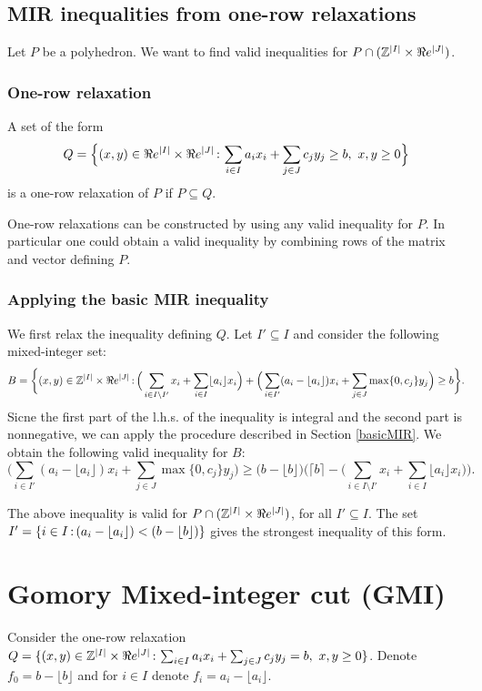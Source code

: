 \subsection{MIR inequalities from one-row relaxations}
Let $P$ be a polyhedron. We want to find valid inequalities for $P\cap ({\mathbb{Z}}^{|I|}\times \Re e^{|J|})$. 
\subsubsection{One-row relaxation}
A set of the form 
$$Q=\Big\{(x,y)\in \Re e^{|I|}\times \Re e^{|J|}{\,:\,} \sum_{i\in I}a_ix_i+\sum_{j\in J}c_jy_j\geq b,\ x,y\geq0\Big\}$$ 
is a one-row relaxation of $P$ if $P\subseteq Q$. 
\begin{remark}{}{}
One-row relaxations can be constructed by using any valid inequality for $P$. In particular one could obtain a valid inequality by combining rows of the matrix  and vector defining $P$.
\end{remark}
\subsubsection{Applying the basic MIR inequality}
We first relax the inequality defining $Q$. Let $I'\subseteq I$ and  consider the following mixed-integer set:
$$B=\bigg\{(x,y)\in {\mathbb{Z}}^{|I|}\times \Re e^{|J|}{\,:\,}\Big(\sum_{i\in I\setminus I'}x_i + \sum_{i\in I}\lfloor a_i\rfloor x_i\Big)+\Big(\sum_{i\in I'}(a_i-\lfloor a_i\rfloor)x_i+ \sum_{j\in J}\max\{0,c_j\}y_j\Big)\geq b\bigg\}.$$
Sicne the first part of the l.h.s. of the inequality is integral and the second part is nonnegative, we can apply the procedure described in Section \ref{basicMIR}. We obtain the following valid inequality for $B$:
$$\Big(\sum_{i\in I'}(a_i-\lfloor a_i\rfloor)x_i+ \sum_{j\in J}\max\{0,c_j\}y_j\Big)\geq \big(b-\lfloor b \rfloor\big)\bigg(\lceil b\rceil - \Big(\sum_{i\in I\setminus I'}x_i + \sum_{i\in I}\lfloor a_i\rfloor x_i\Big)\bigg).$$
\begin{remark}{}{}
The above inequality is valid for $P\cap ({\mathbb{Z}}^{|I|}\times \Re e^{|J|})$, for all $I'\subseteq I$. The set $I'=\{i\in I{\,:\,} (a_i-\lfloor a_i\rfloor)<(b-\lfloor b\rfloor)\}$ gives the strongest inequality of this form.
\end{remark}

\section{Gomory Mixed-integer cut (GMI)}
Consider the one-row relaxation $Q=\{(x,y)\in {\mathbb{Z}}^{|I|}\times \Re e^{|J|}{\,:\,} \sum_{i\in I}a_ix_i+\sum_{j\in J}c_jy_j= b,\ x,y\geq0\}$. Denote $f_0=b-\lfloor b\rfloor$ and for $i\in I$ denote $f_i=a_i-\lfloor a_i\rfloor$. 

